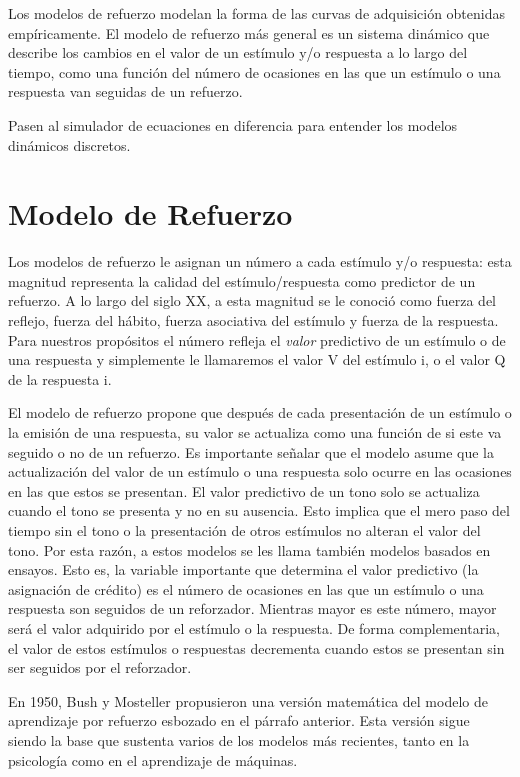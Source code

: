 \documentclass[
  letterpaper,
]{book}
\begin{document}
Los modelos de refuerzo modelan la forma de las curvas de adquisición
obtenidas empíricamente. El modelo de refuerzo más general es un sistema
dinámico que describe los cambios en el valor de un estímulo y/o
respuesta a lo largo del tiempo, como una función del número de
ocasiones en las que un estímulo o una respuesta van seguidas de un
refuerzo.

Pasen al simulador de ecuaciones en diferencia para entender los modelos
dinámicos discretos.

\section{Modelo de Refuerzo}\label{modelo-de-refuerzo}

Los modelos de refuerzo le asignan un número a cada estímulo y/o
respuesta: esta magnitud representa la calidad del estímulo/respuesta
como predictor de un refuerzo. A lo largo del siglo XX, a esta magnitud
se le conoció como fuerza del reflejo, fuerza del hábito, fuerza
asociativa del estímulo y fuerza de la respuesta. Para nuestros
propósitos el número refleja el \emph{valor} predictivo de un estímulo o
de una respuesta y simplemente le llamaremos el valor V del estímulo i,
o el valor Q de la respuesta i.

El modelo de refuerzo propone que después de cada presentación de un
estímulo o la emisión de una respuesta, su valor se actualiza como una
función de si este va seguido o no de un refuerzo. Es importante señalar
que el modelo asume que la actualización del valor de un estímulo o una
respuesta solo ocurre en las ocasiones en las que estos se presentan. El
valor predictivo de un tono solo se actualiza cuando el tono se presenta
y no en su ausencia. Esto implica que el mero paso del tiempo sin el
tono o la presentación de otros estímulos no alteran el valor del tono.
Por esta razón, a estos modelos se les llama también modelos basados en
ensayos. Esto es, la variable importante que determina el valor
predictivo (la asignación de crédito) es el número de ocasiones en las
que un estímulo o una respuesta son seguidos de un reforzador. Mientras
mayor es este número, mayor será el valor adquirido por el estímulo o la
respuesta. De forma complementaria, el valor de estos estímulos o
respuestas decrementa cuando estos se presentan sin ser seguidos por el
reforzador.

En 1950, Bush y Mosteller propusieron una versión matemática del modelo
de aprendizaje por refuerzo esbozado en el párrafo anterior. Esta
versión sigue siendo la base que sustenta varios de los modelos más
recientes, tanto en la psicología como en el aprendizaje de máquinas.
\end{document}
